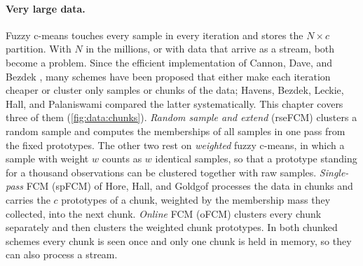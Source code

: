 \paragraph{Very large data.} Fuzzy c-means touches every sample in every iteration and stores the $N\times c$ partition. With $N$ in the millions, or with data that arrive as a stream, both become a problem. Since the efficient implementation of Cannon, Dave, and Bezdek \cite{cannon:1986:efficient}, many schemes have been proposed that either make each iteration cheaper \cite{kolen:2002:complexity} or cluster only samples or chunks of the data; Havens, Bezdek, Leckie, Hall, and Palaniswami \cite{havens:2012:large} compared the latter systematically. This chapter covers three of them (\cref{fig:data:chunks}). \emph{Random sample and extend} (rseFCM) clusters a random sample and computes the memberships of all samples in one pass from the fixed prototypes. The other two rest on \emph{weighted} fuzzy c-means, in which a sample with weight $w$ counts as $w$ identical samples, so that a prototype standing for a thousand observations can be clustered together with raw samples. \emph{Single-pass} FCM (spFCM) of Hore, Hall, and Goldgof \cite{hore:2007:spfcm} processes the data in chunks and carries the $c$ prototypes of a chunk, weighted by the membership mass they collected, into the next chunk. \emph{Online} FCM (oFCM) \cite{hore:2009:scalable} clusters every chunk separately and then clusters the weighted chunk prototypes. In both chunked schemes every chunk is seen once and only one chunk is held in memory, so they can also process a stream.

